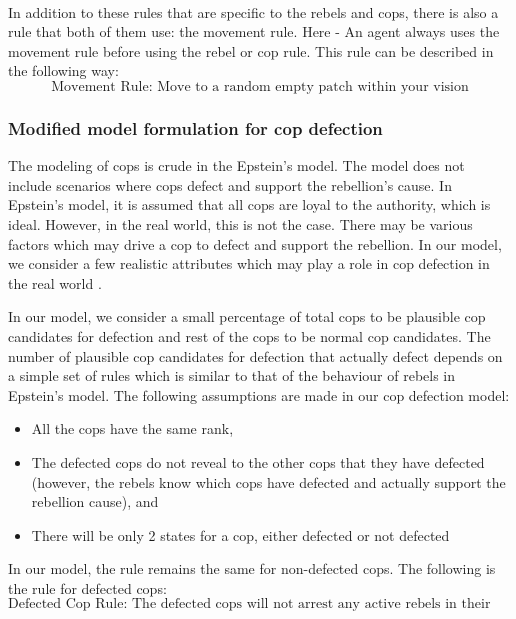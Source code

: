 \documentclass[a4paper,11pt]{article}
\begin{document}
\\
In addition to these rules that are specific to the rebels and cops, there is also a rule that both of them use: the movement rule. Here - An agent always uses the movement rule before using the rebel or cop rule. This rule can be described in the following way:
\[\text{Movement Rule: Move to a random empty patch within your vision}\]
\subsubsection{Modified model formulation for cop defection}
The modeling of cops is crude in the Epstein's model. The model does not include scenarios where cops defect and support the rebellion's cause. In Epstein's model, it is assumed that all cops are loyal to the authority, which is ideal. However, in the real world, this is not the case. There may be various factors which may drive a cop to defect and support the rebellion. In our model, we consider a few realistic attributes which may play a role in cop defection in the real world \cite{policeintegrity, policecorruption}.

In our model, we consider a small percentage of total cops to be plausible cop candidates for defection and rest of the cops to be normal cop candidates. The number of plausible cop candidates for defection that actually defect depends on a simple set of rules which is similar to that of the behaviour of rebels in Epstein's model\cite{epstein2002modeling}.
The following assumptions are made in our cop defection model:
\begin{itemize}
    \item All the cops have the same rank, 
    \item The defected cops do not reveal to the other cops that they have defected (however, the rebels know which cops have defected and actually support the rebellion cause), and
    \item There will be only 2 states for a cop, either defected or not defected
\end{itemize}
In our model, the rule remains the same for non-defected cops. The following is the rule for defected cops:
\[\text{Defected Cop Rule: The defected cops will not arrest any active rebels in their vision}\]
\end{document}
